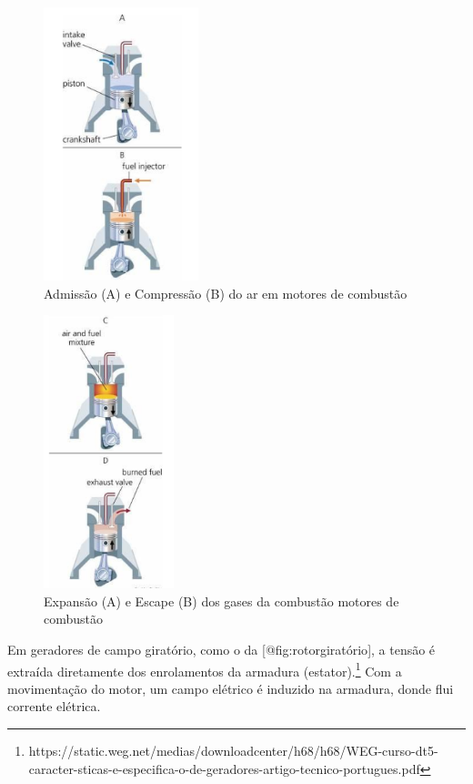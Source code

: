 \documentclass[
]{article}
\begin{document}
\begin{figure}
\hypertarget{fig:diesel1}{%
\centering
\includegraphics[width=\textwidth,height=3.125in]{img/gerador/motor1.png}
\caption{Admissão (A) e Compressão (B) do ar em motores de
combustão}\label{fig:diesel1}
}
\end{figure}

\begin{figure}
\hypertarget{fig:diesel2}{%
\centering
\includegraphics[width=\textwidth,height=3.125in]{img/gerador/motor2.png}
\caption{Expansão (A) e Escape (B) dos gases da combustão motores de
combustão}\label{fig:diesel2}
}
\end{figure}

Em geradores de campo giratório, como o da {[}@fig:rotorgiratório{]}, a
tensão é extraída diretamente dos enrolamentos da armadura
(estator).\footnote{https://static.weg.net/medias/downloadcenter/h68/h68/WEG-curso-dt5-caracter-sticas-e-especifica-o-de-geradores-artigo-tecnico-portugues.pdf}
Com a movimentação do motor, um campo elétrico é induzido na armadura,
donde flui corrente elétrica.
\end{document}
